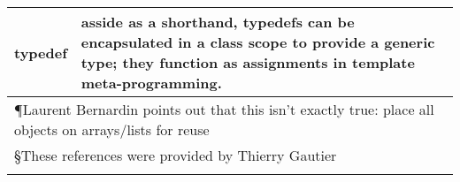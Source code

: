 \documentclass[12pt]{article}
\newcommand{\mycr}{\\\hline}
\newlength{\colwidth}\setlength{\colwidth}{\textwidth}
\newenvironment{mytabular}%
{\par\noindent
\begin{longtable}[l]{%
|p{\colwidth}%
p{\colwidth}|%
}%
}%
{\end{longtable}\par\vspace{\medskipamount}\goodbreak}
\newenvironment{mytabular}
{
\begin{tabular}[t]{|ll|}
}
{
\end{tabular}
}
\newcommand{\code}[1]{{\ttfamily #1}}
\begin{document}
\begin{mytabular}
\code{typedef} & asside as a shorthand, \code{typedef}s
   can be encapsulated in a class scope to provide a
   generic type; they function as
   assignments in template meta-programming. \mycr

\multicolumn{2}{|l|}{\P Laurent Bernardin points out that this isn't exactly
true: place all objects on arrays/lists for reuse}
\mycr
\multicolumn{2}{|l|}{\S These references were provided by Thierry Gautier}
\mycr
\endlastfoot

\end{mytabular}
\end{document}
